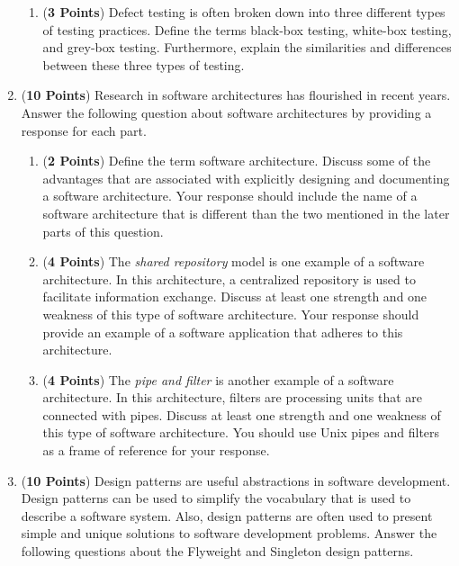 \documentclass[12pt,epsf,psfig,graphics]{article}
\begin{document}
\begin{enumerate}
\begin{enumerate}
\item ({\bf 3 Points}) Defect testing is often broken down into three
  different types of testing practices.  Define the terms black-box
  testing, white-box testing, and grey-box testing.  Furthermore,
  explain the similarities and differences between these three types
  of testing.

\end{enumerate}

\newpage

\item ({\bf 10 Points}) Research in software architectures has flourished
in recent years.  Answer the following question about software architectures
by providing a response for each part.

\begin{enumerate}

\item ({\bf 2 Points}) Define the term software architecture.  Discuss
  some of the advantages that are associated with explicitly designing
  and documenting a software architecture.  Your response should
  include the name of a software architecture that is different than
  the two mentioned in the later parts of this question.

\item ({\bf 4 Points}) The {\em shared repository} model is one
  example of a software architecture.  In this architecture, a
  centralized repository is used to facilitate information exchange.
  Discuss at least one strength and one weakness of this type of
  software architecture.  Your response should provide an example of a
  software application that adheres to this architecture.

\item ({\bf 4 Points}) The {\em pipe and filter} is another example of
  a software architecture.  In this architecture, filters are
  processing units that are connected with pipes.  Discuss at least
  one strength and one weakness of this type of software architecture.
  You should use Unix pipes and filters as a frame of reference for
  your response.

\end{enumerate}

\newpage

\item ({\bf 10 Points}) Design patterns are useful abstractions in
  software development.  Design patterns can be used to simplify the
  vocabulary that is used to describe a software system.  Also, design
  patterns are often used to present simple and unique solutions to
  software development problems.  Answer the following questions about
  the Flyweight and Singleton design patterns.


\end{enumerate}
\end{document}
